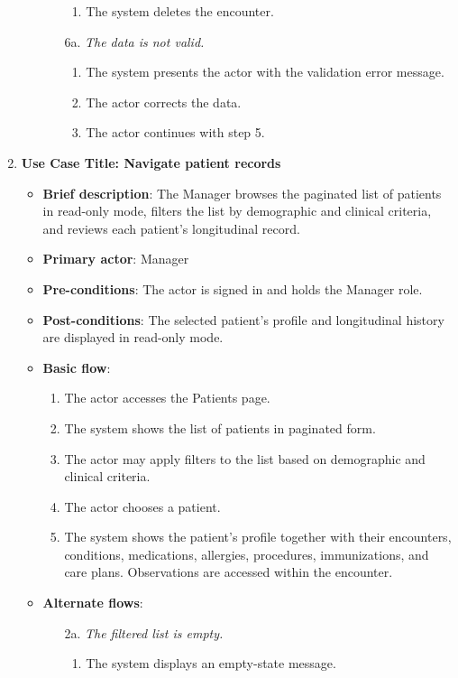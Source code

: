 \begin{enumerate}
\begin{itemize}
\begin{itemize}
\begin{enumerate}
            \item The system deletes the encounter.
        \end{enumerate}
        \item[6a.] \textit{The data is not valid.}
        \begin{enumerate}
            \item The system presents the actor with the validation error message.
            \item The actor corrects the data.
            \item The actor continues with step 5.
        \end{enumerate}
    \end{itemize}
\end{itemize}

\vspace{0.5em}

\item \textbf{Use Case Title: Navigate patient records}
\begin{itemize}
    \item \textbf{Brief description}: The Manager browses the paginated list of patients in read-only mode, filters the list by demographic and clinical criteria, and reviews each patient's longitudinal record.
    \item \textbf{Primary actor}: Manager
    \item \textbf{Pre-conditions}: The actor is signed in and holds the Manager role.
    \item \textbf{Post-conditions}: The selected patient's profile and longitudinal history are displayed in read-only mode.
    \item \textbf{Basic flow}:
    \begin{enumerate}
        \item The actor accesses the Patients page.
        \item The system shows the list of patients in paginated form.
        \item The actor may apply filters to the list based on demographic and clinical criteria.
        \item The actor chooses a patient.
        \item The system shows the patient's profile together with their encounters, conditions, medications, allergies, procedures, immunizations, and care plans. Observations are accessed within the encounter.
    \end{enumerate}
    \item \textbf{Alternate flows}:
    \begin{itemize}
        \item[2a.] \textit{The filtered list is empty.}
        \begin{enumerate}
            \item The system displays an empty-state message.
        \end{enumerate}
    \end{itemize}
\end{itemize}


\end{enumerate}
